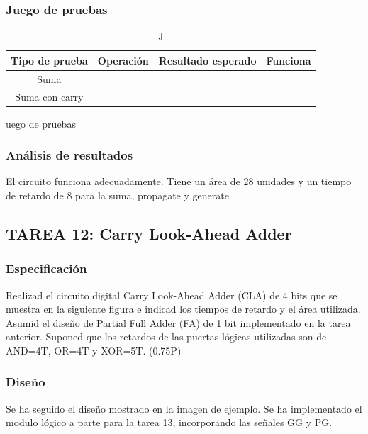 \documentclass{article}
\begin{document}
		\subsubsection*{Juego de pruebas}
		\begin{table}[h]
			\begin{center}
				\begin{tabular}{| c | c | c | c |}
					\hline
					Tipo de prueba & Operación & Resultado esperado & Funciona \\ \hline
					
					Suma & & & \\ \hline
					Suma con carry & & & \\ \hline
				\end{tabular}
				\caption Juego de pruebas
			\end{center}
		\end{table}



		\subsubsection*{Análisis de resultados}
		El circuito funciona adecuadamente. Tiene un área de 28 unidades y un tiempo de retardo de 8 para la suma, propagate y generate. 

	\subsection{TAREA 12: Carry Look-Ahead Adder}
		\subsubsection*{Especificación}
		Realizad el circuito digital Carry Look-Ahead Adder (CLA) de 4 bits que se muestra en
la siguiente figura e indicad los tiempos de retardo y el área utilizada. Asumid el diseño de Partial
Full Adder (FA) de 1 bit implementado en la tarea anterior. Suponed que los retardos de las puertas
lógicas utilizadas son de AND=4T, OR=4T y XOR=5T. (0.75P)


		\subsubsection*{Diseño}
		Se ha seguido el diseño mostrado en la imagen de ejemplo. Se ha implementado el modulo lógico a parte para la tarea 13, incorporando las señales GG y PG.
\end{document}
